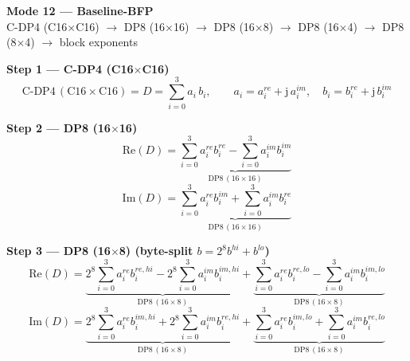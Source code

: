 \documentclass[fleqn]{article}
\newcommand{\DPop}[3]{\mathrm{DP#1}\,(#2\!\times\!#3)}
\begin{document}
\begin{center}
{\LARGE \textbf{Mode 12 --- Baseline-BFP}}\\[4pt]
{\large C-DP4 (C16$\times$C16) $\rightarrow$ DP8 (16$\times$16) $\rightarrow$ DP8 (16$\times$8) $\rightarrow$ DP8 (16$\times$4) $\rightarrow$ DP8 (8$\times$4) $\rightarrow$ block exponents}
\end{center}

\vspace{0.3em}

\noindent\textbf{Step 1 --- C-DP4 (C16$\times$C16)}
\[
\text{C-DP4}\,(\mathrm{C16}\!\times\!\mathrm{C16}) = D = \sum_{i=0}^{3} a_i \, b_i, \qquad
a_i = a_i^{re} + \mathrm{j}\,a_i^{im}, \quad
b_i = b_i^{re} + \mathrm{j}\,b_i^{im}
\]

\vspace{0.3em}

\noindent\textbf{Step 2 --- DP8 (16$\times$16)}
\[
\mathrm{Re}(D) = \underbrace{\sum_{i=0}^{3} a_i^{re} b_i^{re}
  - \sum_{i=0}^{3} a_i^{im} b_i^{im}}_{\DPop{8}{16}{16}}
\]
\[
\mathrm{Im}(D) = \underbrace{\sum_{i=0}^{3} a_i^{re} b_i^{im}
  + \sum_{i=0}^{3} a_i^{im} b_i^{re}}_{\DPop{8}{16}{16}}
\]

\vspace{0.3em}

\noindent\textbf{Step 3 --- DP8 (16$\times$8) \quad (byte-split $b = 2^{8} b^{hi} + b^{lo}$)}
\[
\mathrm{Re}(D) = \underbrace{2^{8}\sum_{i=0}^{3} a_i^{re} b_i^{re,hi}
  - 2^{8}\sum_{i=0}^{3} a_i^{im} b_i^{im,hi}}_{\DPop{8}{16}{8}}
  + \underbrace{\sum_{i=0}^{3} a_i^{re} b_i^{re,lo}
  - \sum_{i=0}^{3} a_i^{im} b_i^{im,lo}}_{\DPop{8}{16}{8}}
\]
\[
\mathrm{Im}(D) = \underbrace{2^{8}\sum_{i=0}^{3} a_i^{re} b_i^{im,hi}
  + 2^{8}\sum_{i=0}^{3} a_i^{im} b_i^{re,hi}}_{\DPop{8}{16}{8}}
  + \underbrace{\sum_{i=0}^{3} a_i^{re} b_i^{im,lo}
  + \sum_{i=0}^{3} a_i^{im} b_i^{re,lo}}_{\DPop{8}{16}{8}}
\]

\vspace{0.3em}
\end{document}
